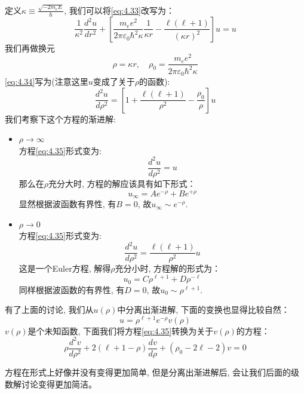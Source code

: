 \documentclass[a4paper,zihao=-4,linespread=1]{ctexrep}
\begin{document}
    定义$\kappa\equiv\frac{\sqrt{-2m_eE}}{\hbar}$, 我们可以将\ref{eq:4.33}改写为：
    \begin{equation}
        \label{eq:4.34}
        \frac{1}{\kappa^2}\frac{d^2u}{dr^2}+\left[\frac{m_ee^2}{2\pi\varepsilon_0\hbar^2\kappa}\frac{1}{\kappa r}-\frac{\ell\left(\ell+1\right)}{\left(\kappa r\right)^2}\right]u=u
    \end{equation}
    我们再做换元\[\rho=\kappa r,\quad \rho_0=\frac{m_ee^2}{2\pi\varepsilon_0\hbar^2\kappa}\]
    \ref{eq:4.34}写为(注意这里$u$变成了关于$\rho$的函数):
    \begin{equation}
        \label{eq:4.35}
        \frac{d^2u}{d\rho^2}=\left[1+\frac{\ell\left(\ell+1\right)}{\rho^2}-\frac{\rho_0}{\rho}\right]u
    \end{equation}
    我们考察下这个方程的渐进解:
    \begin{itemize}
        \item $\rho\to\infty$\\
                方程\ref{eq:4.35}形式变为:
                \[\frac{d^2u}{d\rho^2}=u\]
                那么在$\rho $充分大时, 方程的解应该具有如下形式：\[u_\infty=Ae^{-\rho}+Be^{+\rho}\]
                显然根据波函数有界性, 有$B=0$, 故$u_\infty\sim e^{-\rho}$.
        \item $\rho\to 0$\\
                方程\ref{eq:4.35}形式变为:
                \[\frac{d^2u}{d\rho^2}=\frac{\ell\left(\ell+1\right)}{\rho^2}u\]
                这是一个Euler方程, 解得$\rho$充分小时, 方程解的形式为：\[u_0=C\rho^{\ell+1}+D\rho^{-\ell}\]
                同样根据波函数的有界性, 有$D=0$, 故$u_0\sim \rho^{\ell+1}$.
    \end{itemize}
    
    有了上面的讨论, 我们从$u(\rho)$中分离出渐进解, 下面的变换也显得比较自然：
    \[u=\rho^{\ell+1}e^{-\rho}v(\rho)\]
    $v(\rho)$是个未知函数, 下面我们将方程\ref{eq:4.35}转换为关于$v(\rho)$的方程：
    \begin{equation}
        \label{eq:4.36}
        \rho\frac{d^2v}{d\rho^2}+2\left(\ell+1-\rho\right)\frac{dv}{d\rho}+\left(\rho_0-2\ell-2\right)v=0
    \end{equation}
    
    方程在形式上好像并没有变得更加简单, 但是分离出渐进解后, 会让我们后面的级数解讨论变得更加简洁。
    
\end{document}
